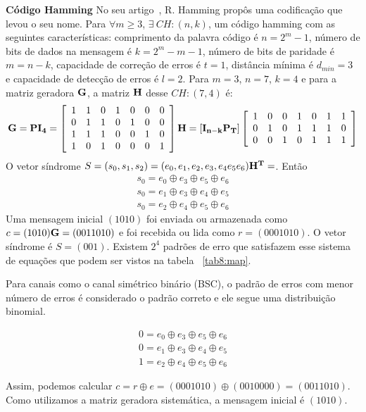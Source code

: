 \begin{example} {\bf Código Hamming} \label{CodHamm} 
No seu artigo~\cite{Hamming:1950}, R. Hamming propôs uma codificação que levou o seu nome. Para $\forall m \geq 3$, $\exists\ CH:(n,k)$, um código hamming com as seguintes características: comprimento da palavra código é $n=2^m -1$, número de bits de dados na mensagem é $k=2^m-m-1$, número de bits de paridade é $m=n-k$, capacidade de correção de erros é $t=1$, distância mínima é $d_{min} = 3$ e capacidade de detecção de erros é $l=2$. Para $m=3$, $n=7$, $k=4$ e para a matriz geradora ${\bf G}$, a matriz ${\bf H}$ desse $CH:(7,4)$ é:
\begin{align*}
{\bf G} = {\bf PI_4} = \left[\begin{array}{ccccccc}
1 & 1 & 0 & 1 & 0 & 0 & 0\\
0 & 1 & 1 & 0 & 1 & 0 & 0\\
1 & 1 & 1 & 0 & 0 & 1 & 0\\
1 & 0 & 1 & 0 & 0 & 0 & 1
\end{array}\right]
{\bf H} = \left[ {\bf I_{n-k}P_T} \right] \left[\begin{array}{ccccccc}
1 & 0 & 0 & 1 & 0 & 1 & 1\\
0 & 1 & 0 & 1 & 1 & 1 & 0\\
0 & 0 & 1 & 0 & 1 & 1 & 1
\end{array}\right]
\end{align*}
O vetor síndrome $S=(s_0, s_1, s_2)= (e_0, e_1, e_2, e_3, e_4 e_5 e_6){\bf H^T}=$. Então
\begin{align*}
s_0=e_0 \oplus e_3 \oplus e_5 \oplus e_6\\
s_0=e_1 \oplus e_3 \oplus e_4 \oplus e_5\\
s_0=e_2 \oplus e_4 \oplus e_5 \oplus e_6
\end{align*}
Uma mensagem inicial $(1010)$ foi enviada ou armazenada como $c=(1010){\bf G}=(0011010)$ e foi recebida ou lida como $r=(0001010)$. O vetor síndrome é $S=(001)$. Existem $2^4$ padrões de erro que satisfazem esse sistema de equações que podem ser vistos na tabela ~\ref{tab8:map}.



Para canais como o canal simétrico binário (BSC), o padrão de erros com menor número de erros é considerado o padrão correto e ele segue uma distribuição binomial.

\begin{align*}
0=e_0 \oplus e_3 \oplus e_5 \oplus e_6\\
0=e_1 \oplus e_3 \oplus e_4 \oplus e_5\\
1=e_2 \oplus e_4 \oplus e_5 \oplus e_6
\end{align*}

Assim, podemos calcular $c=r \oplus e= (0001010) \oplus (0010000)=(0011010)$. Como utilizamos a matriz geradora sistemática, a mensagem inicial é $(1010)$.

\end{example}


